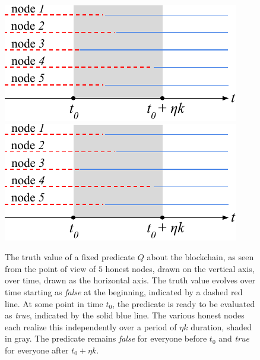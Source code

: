 \begin{figure}
    \caption{The truth value of a fixed predicate $Q$ about the blockchain, as
             seen from the point of view of $5$ honest nodes, drawn on the
             vertical axis, over time, drawn as the horizontal axis. The truth
             value evolves over time starting as \emph{false} at the beginning,
             indicated by a dashed red line. At some point in time $t_0$, the
             predicate is ready to be evaluated as \emph{true}, indicated by the
             solid blue line. The various honest nodes each realize this
             independently over a period of $\eta k$ duration, shaded in gray.
             The predicate remains \emph{false} for everyone before $t_0$ and
             \emph{true} for everyone after $t_0 + \eta k$.}
    \centering
    \iftwocolumn
        \includegraphics[width=0.5 \columnwidth,keepaspectratio]{figures/predicate-evolution.pdf}
    \else
        \includegraphics[width=0.5\columnwidth,keepaspectratio]{figures/predicate-evolution.pdf}
    \fi
    \label{fig.evolution}
\end{figure}


